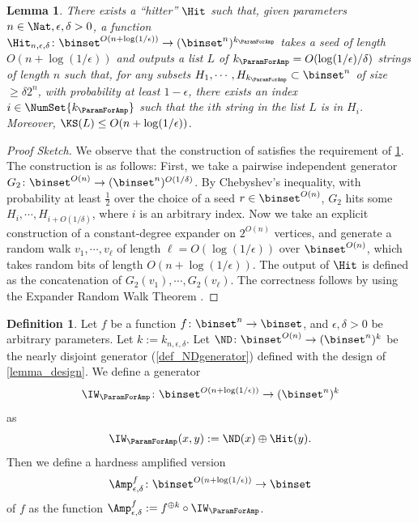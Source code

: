 \documentclass[11pt]{article}
\numberwithin{equation}{section}
\newtheorem{lemma}[theorem]{Lemma}
\theoremstyle{definition}
\newtheorem{definition}[theorem]{Definition}
\theoremstyle{plain}
\begin{document}
\begin{lemma}
  \label{lemma_hitter}
  There exists a \emph{``hitter''} $\Hit$ such that, given parameters $n \in \Nat, \epsilon, \delta > 0$,
  a function $\Hit_{n, \epsilon, \delta} \colon \binset^{O(n + \log( 1 / \epsilon) )} \to (\binset^n)^{k_\ParamForAmp}$ takes a seed of length $O(n + \log ( 1 / \epsilon ))$
  and outputs
  a list $L$ of
  $k_\ParamForAmp = O(\log(1 / \epsilon) / \delta)$ strings of length $n$
  such that,
  for any subsets $H_1, \cdots, H_{k_\ParamForAmp} \subset \binset^n$ of size $\ge \delta 2^n$,
  with probability at least $1 - \epsilon$,
  there exists an index $i \in \NumSet{k_\ParamForAmp}$ such that the $i$th string in the list $L$ is in $H_i$.
  Moreover, $\KS(L) \le O(n + \log ( 1 / \epsilon ))$.
\end{lemma}

\begin{proof}
  [Proof Sketch]
  We observe that the construction of \cite[Appendix C]{Goldreich11j_goldreich2011_sp_books} satisfies the requirement of \cref{lemma_hitter}.
  The construction is as follows:
  First, we take a pairwise independent generator $G_2 \colon \binset^{O(n)} \to (\binset^n)^{O(1 / \delta)}$.
  By Chebyshev's inequality, with probability at least $\frac{1}{2}$ over the choice of a seed $r \in \binset^{O(n)}$,
  $G_2$ hits some $H_i, \cdots, H_{i + O(1 / \delta)}$, where $i$ is an arbitrary index.
  Now we take an explicit construction of a constant-degree expander on $2^{O(n)}$ vertices,
  and generate a random walk $v_1, \cdots, v_\ell$ of length $\ell = O(\log (1 / \epsilon))$ over $\binset^{O(n)}$,
  which takes random bits of length $O(n + \log (1 / \epsilon))$.
  The output of $\Hit$ is defined as the concatenation of $G_2(v_1), \cdots, G_2(v_\ell)$.
  The correctness follows by using the Expander Random Walk Theorem \cite[Theorem A.4]{Goldreich11j_goldreich2011_sp_books}.
\end{proof}

%
%

\begin{definition}
  Let $f$ be a function $f \colon \binset^n \to \binset$, and $\epsilon, \delta > 0$ be arbitrary parameters.
  Let $k := k_{n, \epsilon, \delta}$.
  Let $\ND \colon \binset^{O(n)} \to (\binset^n)^{k}$ be the nearly disjoint generator (\cref{def_NDgenerator}) defined with the design of \cref{lemma_design}.
  We define a generator $$\IW_\ParamForAmp \colon \binset^{O(n + \log(1 / \epsilon))} \to (\binset^n)^{k}$$ as $$\IW_\ParamForAmp(x, y) := \ND(x) \oplus \Hit(y).$$
  Then we
  define a hardness amplified version $$\Amp_{\epsilon, \delta}^f \colon \binset^{O(n + \log(1 / \epsilon))} \to \binset$$ of $f$
  as
  the function $\Amp_{\epsilon, \delta}^f := f^{\oplus k} \circ \IW_\ParamForAmp$.
\end{definition}
\end{document}
